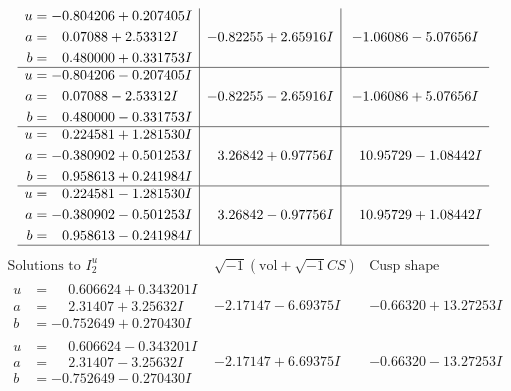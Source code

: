 \documentclass[1p]{elsarticle_modified}
\theoremstyle{definition}
\newcommand{\I}{\sqrt{-1}}
\begin{document}
$$\begin{array}{c|c|c}
\begin{aligned}
u &= -0.804206 + 0.207405 I \\
a &= \phantom{-}0.07088 + 2.53312 I \\
b &= \phantom{-}0.480000 + 0.331753 I\end{aligned}
 & -0.82255 + 2.65916 I & -1.06086 - 5.07656 I \\ \hline\begin{aligned}
u &= -0.804206 - 0.207405 I \\
a &= \phantom{-}0.07088 - 2.53312 I \\
b &= \phantom{-}0.480000 - 0.331753 I\end{aligned}
 & -0.82255 - 2.65916 I & -1.06086 + 5.07656 I \\ \hline\begin{aligned}
u &= \phantom{-}0.224581 + 1.281530 I \\
a &= -0.380902 + 0.501253 I \\
b &= \phantom{-}0.958613 + 0.241984 I\end{aligned}
 & \phantom{-}3.26842 + 0.97756 I & \phantom{-}10.95729 - 1.08442 I \\ \hline\begin{aligned}
u &= \phantom{-}0.224581 - 1.281530 I \\
a &= -0.380902 - 0.501253 I \\
b &= \phantom{-}0.958613 - 0.241984 I\end{aligned}
 & \phantom{-}3.26842 - 0.97756 I & \phantom{-}10.95729 + 1.08442 I\\
 \hline 
 \end{array}$$\newpage$$\begin{array}{c|c|c}  
\text{Solutions to }I^u_{2}& \I (\text{vol} + \sqrt{-1}CS) & \text{Cusp shape}\\
 \hline 
\begin{aligned}
u &= \phantom{-}0.606624 + 0.343201 I \\
a &= \phantom{-}2.31407 + 3.25632 I \\
b &= -0.752649 + 0.270430 I\end{aligned}
 & -2.17147 - 6.69375 I & -0.66320 + 13.27253 I \\ \hline\begin{aligned}
u &= \phantom{-}0.606624 - 0.343201 I \\
a &= \phantom{-}2.31407 - 3.25632 I \\
b &= -0.752649 - 0.270430 I\end{aligned}
 & -2.17147 + 6.69375 I & -0.66320 - 13.27253 I \\ \hline\begin{aligned}

\end{aligned}
\end{array}$$
\end{document}
